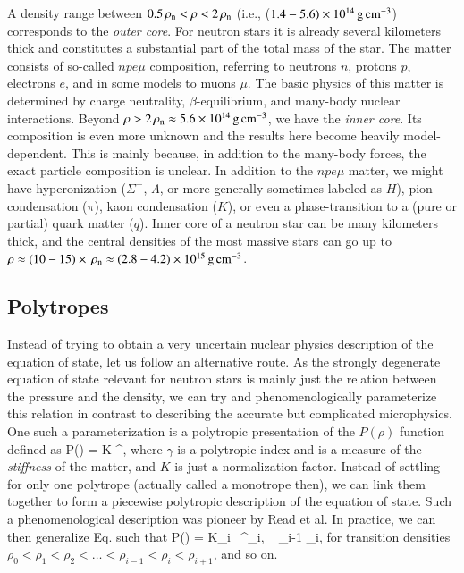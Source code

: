 A density range between $0.5 \, \rho_{\mathrm{n}}  < \rho < 2\, \rho_{\mathrm{n}} $ (i.e., ($1.4 - 5.6) \times 10^{14}\, \mathrm{g}\,\mathrm{cm}^{-3}$) corresponds to the \emph{outer core}.
For neutron stars it is already several kilometers thick and constitutes a substantial part of the total mass of the star.
The matter consists of so-called $npe\mu$ composition, referring to neutrons $n$, protons $p$, electrons $e$, and in some models to muons $\mu$.
The basic physics of this matter is determined by charge neutrality, $\beta$-equilibrium, and many-body nuclear interactions.
Beyond $\rho > 2 \, \rho_{\mathrm{n}}  \approx 5.6 \times 10^{14}\, \mathrm{g}\,\mathrm{cm}^{-3}$, we have the \emph{inner core}.
Its composition is even more unknown and the results here become heavily model-dependent.
This is mainly because, in addition to the many-body forces, the exact particle composition is unclear.
In addition to the $npe\mu$ matter, we might have hyperonization ($\Sigma^{-}$, $\Lambda$, or more generally sometimes labeled as $H$), pion condensation ($\pi$), kaon condensation ($K$), or even a phase-transition to a (pure or partial) quark matter ($q$).
Inner core of a neutron star can be many kilometers thick, and the central densities of the most massive stars can go up to $\rho \approx (10-15) \times \, \rho_{\mathrm{n}}  \approx (2.8 - 4.2) \times 10^{15} \, \mathrm{g}\,\mathrm{cm}^{-3}$.


\subsection{Polytropes}

Instead of trying to obtain a very uncertain nuclear physics description of the equation of state, let us follow an alternative route.
As the strongly degenerate equation of state relevant for neutron stars is mainly just the relation between the pressure and the density, we can try and phenomenologically parameterize this relation in contrast to describing the accurate but complicated microphysics.
One such a parameterization is a polytropic presentation of the $P(\rho)$ function defined as
\be\label{eq:monotrope}
P(\rho) = K \rho^{\gamma},
\ee
where $\gamma$ is a polytropic index and is a measure of the \emph{stiffness} of the matter, and $K$ is just a normalization factor.
Instead of settling for only one polytrope (actually called a monotrope then), we can link them together to form a piecewise polytropic description of the equation of state.
Such a phenomenological description was pioneer by Read et al.\cite{Read09}
In practice, we can then generalize Eq. such that
\be
P(\rho) = K_i \, \rho^{\gamma_i}, \quad {}~ \rho_{i-1} \le \rho \le \rho_{i},
\ee
for transition densities $\rho_0 < \rho_1 < \rho_2  < \ldots < \rho_{i-1} < \rho_{i} < \rho_{i+1}$, and so on. 

